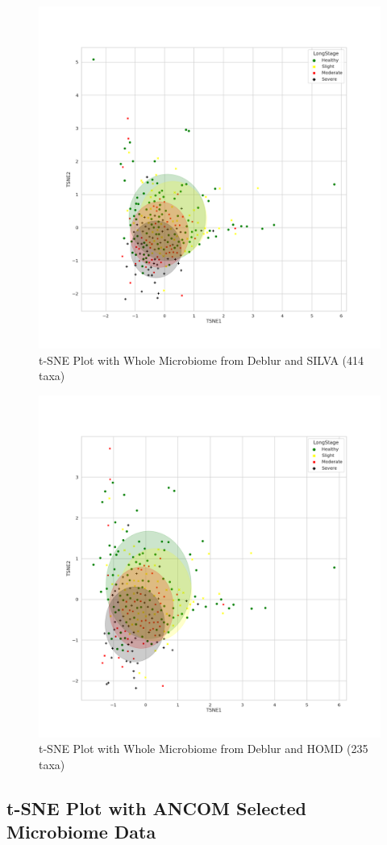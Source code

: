 \documentclass[a4paper]{article}
\begin{document}
            \begin{figure}[p]
                \centering
                \includegraphics[width=0.6 \linewidth]{figures/tSNE/Whole/whole.Deblur.silva.png}
                \caption{t-SNE Plot with Whole Microbiome from Deblur and SILVA (414 taxa)}
                \label{fig:tsne-whole-deblur-silva}
            \end{figure}

            \begin{figure}[p]
                \centering
                \includegraphics[width=0.6 \linewidth]{figures/tSNE/Whole/whole.Deblur.homd.png}
                \caption{t-SNE Plot with Whole Microbiome from Deblur and HOMD (235 taxa)}
                \label{fig:tsne-whole-deblur-homd}
            \end{figure}

        \subsection{t-SNE Plot with ANCOM Selected Microbiome Data}
\end{document}
